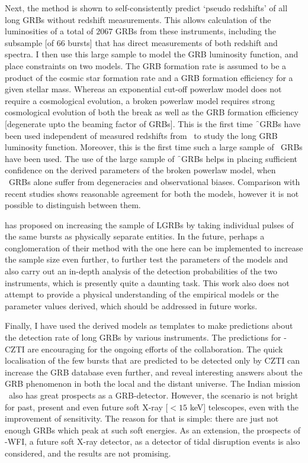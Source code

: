 Next, the method is shown to self-consistently predict `pseudo redshifts' of all long GRBs without redshift measurements. This allows calculation of the luminosities of a total of $2067$ GRBs from these instruments, including the subsample [of $66$ bursts] that has direct measurements of both redshift and spectra. I then use this large sample to model the GRB luminosity function, and place constraints on two models. The GRB formation rate is assumed to be a product of the cosmic star formation rate and a GRB formation efficiency for a given stellar mass. Whereas an exponential cut-off powerlaw model does not require a cosmological evolution, a broken powerlaw model requires strong cosmological evolution of both the break as well as the GRB formation efficiency [degenerate upto the beaming factor of GRBs]. This is the first time \f\ GRBs have been used independent of measured redshifts from \s\ to study the long GRB luminosity function. Moreover, this is the first time such a large sample of \s\ GRBs have been used. The use of the large sample of \f\ GRBs helps in placing sufficient confidence on the derived parameters of the broken powerlaw model, when \s\ GRBs alone suffer from degeneracies and observational biases. Comparison with recent studies shows reasonable agreement for both the models, however it is not possible to distinguish between them.

 has proposed on increasing the sample of LGRBs by taking individual pulses of the same bursts as physically separate entities. In the future, perhaps a conglomeration of their method with the one here can be implemented to increase the sample size even further, to further test the parameters of the models and also carry out an in-depth analysis of the detection probabilities of the two instruments, which is presently quite a daunting task. This work also does not attempt to provide a physical understanding of the empirical models or the parameter values derived, which should be addressed in future works.

Finally, I have used the derived models as templates to make predictions about the detection rate of long GRBs by various instruments. The predictions for \AS -CZTI are encouraging for the ongoing efforts of the collaboration. The quick localisation of the few bursts that are predicted to be detected only by CZTI can increase the GRB database even further, and reveal interesting answers about the GRB phenomenon in both the local and the distant universe. The Indian mission \D\ also has great prospects as a GRB-detector. However, the scenario is not bright for past, present and even future soft X-ray [$< 15$ keV] telescopes, even with the improvement of sensitivity. The reason for that is simple: there are just not enough GRBs which peak at such soft energies. As an extension, the prospects of \A -WFI, a future soft X-ray detector, as a detector of tidal disruption events is also considered, and the results are not promising.